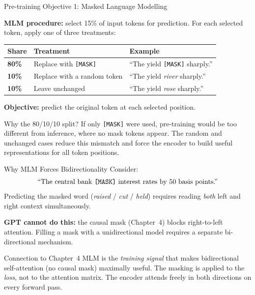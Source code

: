 \documentclass[11pt,aspectratio=169,professionalfonts]{beamer}
\begin{document}
%
%
\begin{frame}{Pre-training Objective 1: Masked Language Modelling}

  \textbf{MLM procedure:} select 15\% of input tokens for prediction.
  For each selected token, apply one of three treatments:
  \medskip

  \begin{center}
  \scriptsize
  \renewcommand{\arraystretch}{1.35}

  \begin{tabular}{@{}lll@{}}
    \toprule
    \textbf{Share} & \textbf{Treatment} & \textbf{Example} \\
    \midrule
    \textbf{80\%}
      & Replace with \texttt{[MASK]}
      & ``The yield \texttt{[MASK]} sharply.'' \\

    \textbf{10\%}
      & Replace with a random token
      & ``The yield \emph{river} sharply.'' \\

    \textbf{10\%}
      & Leave unchanged
      & ``The yield \emph{rose} sharply.'' \\
    \bottomrule
  \end{tabular}

  \end{center}

  \medskip

  \textbf{Objective:} predict the original token at each selected position.

  \begin{block}{Why the 80/10/10 split?}
    If only \texttt{[MASK]} were used, pre-training would be too different
    from inference, where no mask tokens appear. The random and unchanged
    cases reduce this mismatch and force the encoder to build useful
    representations for all token positions.
  \end{block}

\end{frame}
%
%
\begin{frame}{Why MLM Forces Bidirectionality}
  Consider:
  \[
    \text{``The central bank \texttt{[MASK]} interest rates by 50 basis points.''}
  \]
  Predicting the masked word (\emph{raised} / \emph{cut} / \emph{held})
  requires reading \emph{both} left and right context simultaneously.

  \medskip
  \textbf{GPT cannot do this:} the causal mask (Chapter~4) blocks
  right-to-left attention.  Filling a mask with a unidirectional
  model requires a separate bi-directional mechanism.

  \begin{block}{Connection to Chapter~4}
    MLM is the \emph{training signal} that makes bidirectional
    self-attention (no causal mask) maximally useful.
    The masking is applied to the \emph{loss}, not to the attention matrix.
    The encoder attends freely in both directions on every forward pass.
  \end{block}
\end{frame}
\end{document}
